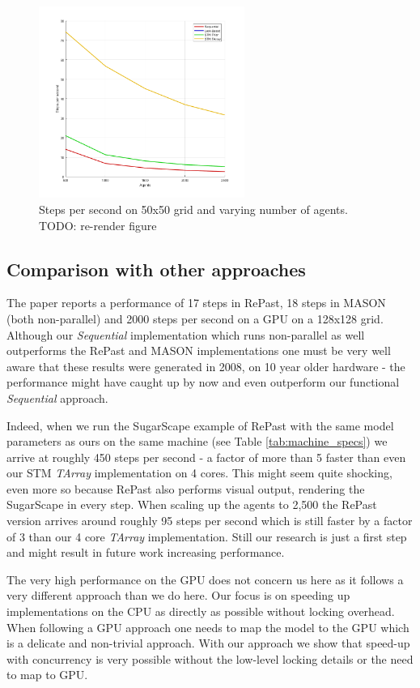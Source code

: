 \begin{figure}
	\centering
	\includegraphics[width=0.6\textwidth, angle=0]{./fig/sugarscape/varying_agents.png}
	\caption{Steps per second on 50x50 grid and varying number of agents. TODO: re-render figure}
	\label{fig:state_results_agentsscale_time}
\end{figure}

\subsection{Comparison with other approaches}
The paper \cite{lysenko_framework_2008} reports a performance of 17 steps in RePast, 18 steps in MASON (both non-parallel) and 2000 steps per second on a GPU on a 128x128 grid. Although our \textit{Sequential} implementation which runs non-parallel as well outperforms the RePast and MASON implementations one must be very well aware that these results were generated in 2008, on 10 year older hardware - the performance might have caught up by now and even outperform our functional \textit{Sequential} approach. 

Indeed, when we run the SugarScape example of RePast with the same model parameters as ours on the same machine (see Table \ref{tab:machine_specs}) we arrive at roughly 450 steps per second - a factor of more than 5 faster than even our STM \textit{TArray} implementation on 4 cores. This might seem quite shocking, even more so because RePast also performs visual output, rendering the SugarScape in every step. When scaling up the agents to 2,500 the RePast version arrives around roughly 95 steps per second which is still faster by a factor of 3 than our 4 core \textit{TArray} implementation. Still our research is just a first step and might result in future work increasing performance.

The very high performance on the GPU does not concern us here as it follows a very different approach than we do here. Our focus is on speeding up implementations on the CPU as directly as possible without locking overhead. When following a GPU approach one needs to map the model to the GPU which is a delicate and non-trivial approach. With our approach we show that speed-up with concurrency is very possible without the low-level locking details or the need to map to GPU.

